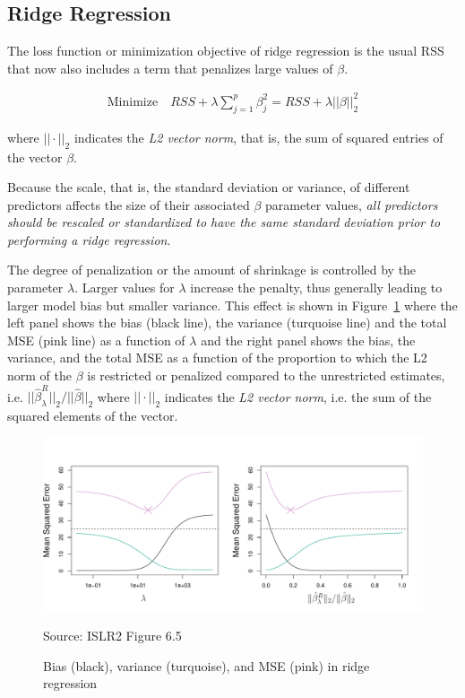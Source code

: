 \subsection{Ridge Regression}

The loss function or minimization objective of ridge regression is the usual RSS that now also includes a term that penalizes large values of $\beta$. 

\begin{align*}
\text{Minimize} \quad RSS + \lambda \sum_{j=1}^p \beta_j^2 = RSS + \lambda ||\beta||_2^2
\end{align*}

\noindent where $||\cdot||_2$ indicates the \emph{L2 vector norm}, that is, the sum of squared entries of the vector $\beta$. 

Because the scale, that is, the standard deviation or variance, of different predictors affects the size of their associated $\beta$ parameter values, \emph{all predictors should be rescaled or standardized to have the same standard deviation prior to performing a ridge regression}. 

The degree of penalization or the amount of shrinkage is controlled by the parameter $\lambda$. Larger values for $\lambda$ increase the penalty, thus generally leading to larger model bias but smaller variance. This effect is shown in Figure~\ref{fig:ridgebias} where the left panel shows the bias (black line), the variance (turquoise line) and the total MSE (pink line) as a function of $\lambda$ and the right panel shows the bias, the variance, and the total MSE as a function of the proportion to which the L2 norm of the $\beta$ is restricted or penalized compared to the unrestricted estimates, i.e. $||\hat{\beta}^R_\lambda||_2 / ||\hat{\beta}||_2$ where $||\cdot||_2$ indicates the \emph{L2 vector norm}, i.e. the sum of the squared elements of the vector.

\begin{figure}
\centering
\includegraphics[width=.9\textwidth]{../class11/Figures_Chapters_1-6/Chapter6/6_5.pdf}

\scriptsize Source: ISLR2 Figure 6.5 \normalsize \\

\caption[Bias, variance, and MSE in ridge regression]{Bias (black), variance (turquoise), and MSE (pink) in ridge regression}
\label{fig:ridgebias}
\end{figure}

